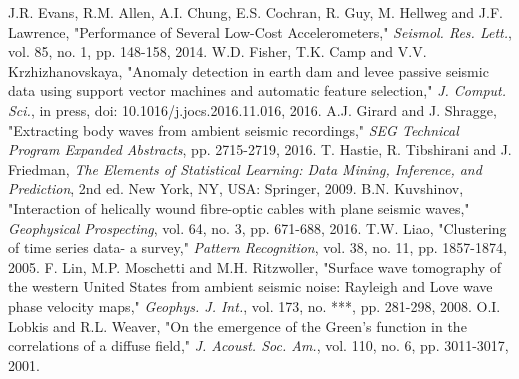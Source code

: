 \documentclass[11pt]{article}
\begin{document}
\begin{thebibliography}{30}
 J.R. Evans, R.M. Allen, A.I. Chung, E.S. Cochran, R. Guy, M. Hellweg and J.F. Lawrence, "Performance of Several Low-Cost Accelerometers," \textit{Seismol. Res. Lett.}, vol. 85, no. 1, pp. 148-158, 2014.
\vspace{-0.2cm}
 W.D. Fisher, T.K. Camp and V.V. Krzhizhanovskaya, "Anomaly detection in earth dam and levee passive seismic data using support vector machines and automatic feature selection," \textit{J. Comput. Sci.}, in press, doi: 10.1016/j.jocs.2016.11.016, 2016.
\vspace{-0.2cm}
 A.J. Girard and J. Shragge, "Extracting body waves from ambient seismic recordings," \textit{SEG Technical Program Expanded Abstracts}, pp. 2715-2719, 2016.
\vspace{-0.2cm}
 T. Hastie, R. Tibshirani and J. Friedman, \textit{The Elements of Statistical Learning: Data Mining, Inference, and Prediction}, 2nd ed. New York, NY, USA: Springer, 2009.
\vspace{-0.2cm}
 B.N. Kuvshinov, "Interaction of helically wound fibre-optic cables with plane seismic waves," \textit{Geophysical Prospecting}, vol. 64, no. 3, pp. 671-688, 2016.
\vspace{-0.2cm}
 T.W. Liao, "Clustering of time series data- a survey," \textit{Pattern Recognition}, vol. 38, no. 11, pp. 1857-1874, 2005.
\vspace{-0.2cm}
 F. Lin, M.P. Moschetti and M.H. Ritzwoller, "Surface wave tomography of the western United States from ambient seismic noise: Rayleigh and Love wave phase velocity maps," \textit{Geophys. J. Int.}, vol. 173, no. ***, pp. 281-298, 2008.
\vspace{-0.2cm}
 O.I. Lobkis and R.L. Weaver, "On the emergence of the Green's function in the correlations of a diffuse field," \textit{J. Acoust. Soc. Am.}, vol. 110, no. 6, pp. 3011-3017, 2001.
\vspace{-0.2cm}

\end{thebibliography}
\end{document}
